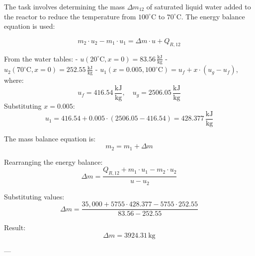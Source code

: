 The task involves determining the mass \( \Delta m_{12} \) of saturated liquid water added to the reactor to reduce the temperature from \( 100^\circ\text{C} \) to \( 70^\circ\text{C} \). The energy balance equation is used:  

\[
m_2 \cdot u_2 - m_1 \cdot u_1 = \Delta m \cdot u + Q_{R,12}
\]

From the water tables:  
- \( u(20^\circ\text{C}, x=0) = 83.56 \, \frac{\text{kJ}}{\text{kg}} \)  
- \( u_2(70^\circ\text{C}, x=0) = 252.55 \, \frac{\text{kJ}}{\text{kg}} \)  
- \( u_1(x=0.005, 100^\circ\text{C}) = u_f + x \cdot (u_g - u_f) \), where:  
  \[
  u_f = 416.54 \, \frac{\text{kJ}}{\text{kg}}, \quad u_g = 2506.05 \, \frac{\text{kJ}}{\text{kg}}
  \]
  Substituting \( x = 0.005 \):  
  \[
  u_1 = 416.54 + 0.005 \cdot (2506.05 - 416.54) = 428.377 \, \frac{\text{kJ}}{\text{kg}}
  \]

The mass balance equation is:  
\[
m_2 = m_1 + \Delta m
\]

Rearranging the energy balance:  
\[
\Delta m = \frac{Q_{R,12} + m_1 \cdot u_1 - m_2 \cdot u_2}{u - u_2}
\]

Substituting values:  
\[
\Delta m = \frac{35,000 + 5755 \cdot 428.377 - 5755 \cdot 252.55}{83.56 - 252.55}
\]

Result:  
\[
\Delta m = 3924.31 \, \text{kg}
\]

---